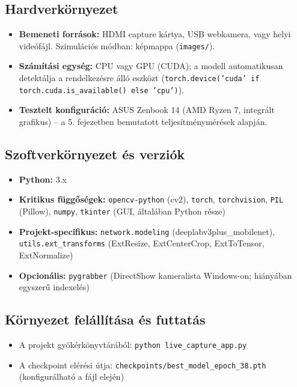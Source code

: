 \subsection{Hardverkörnyezet}
\begin{itemize}
    \item \textbf{Bemeneti források:} HDMI capture kártya, USB webkamera, vagy helyi videófájl. Szimulációs módban: képmappa (\texttt{images/}).
    \item \textbf{Számítási egység:} CPU vagy GPU (CUDA); a modell automatikusan detektálja a rendelkezésre álló eszközt (\texttt{torch.device('cuda' if torch.cuda.is\_available() else 'cpu')}).
    \item \textbf{Tesztelt konfiguráció:} ASUS Zenbook 14 (AMD Ryzen 7, integrált grafikus) – a 5. fejezetben bemutatott teljesítménymérések alapján.
\end{itemize}

\subsection{Szoftverkörnyezet és verziók}
\begin{itemize}
    \item \textbf{Python:} 3.x
    \item \textbf{Kritikus függőségek:} \texttt{opencv-python} (cv2), \texttt{torch}, \texttt{torchvision}, \texttt{PIL} (Pillow), \texttt{numpy}, \texttt{tkinter} (GUI, általában Python része)
    \item \textbf{Projekt-specifikus:} \texttt{network.modeling} (deeplabv3plus\_mobilenet), \texttt{utils.ext\_transforms} (ExtResize, ExtCenterCrop, ExtToTensor, ExtNormalize)
    \item \textbf{Opcionális:} \texttt{pygrabber} (DirectShow kameralista Windows-on; hiányában egyszerű indexelés)
\end{itemize}

\subsection{Környezet felállítása és futtatás}
\begin{itemize}
    \item A projekt gyökérkönyvtárából: \texttt{python live\_capture\_app.py}
    \item A checkpoint elérési útja: \texttt{checkpoints/best\_model\_epoch\_38.pth} (konfigurálható a fájl elején)
\end{itemize}

